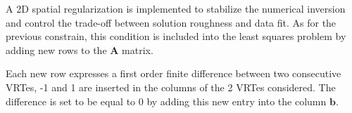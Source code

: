 \documentclass{article}
\begin{document}
A 2D spatial regularization is implemented to stabilize the numerical inversion and control the trade-off between solution roughness and data fit. As for the previous constrain, this condition is included into the least squares problem by adding new rows to the $\bm{A}$ matrix.

Each new row expresses a first order finite difference between two consecutive VRTes, -1 and 1 are inserted in the columns of the 2 VRTes considered. The difference is set to be equal to 0 by adding this new entry into the column $\bm{b}$.

\end{document}
